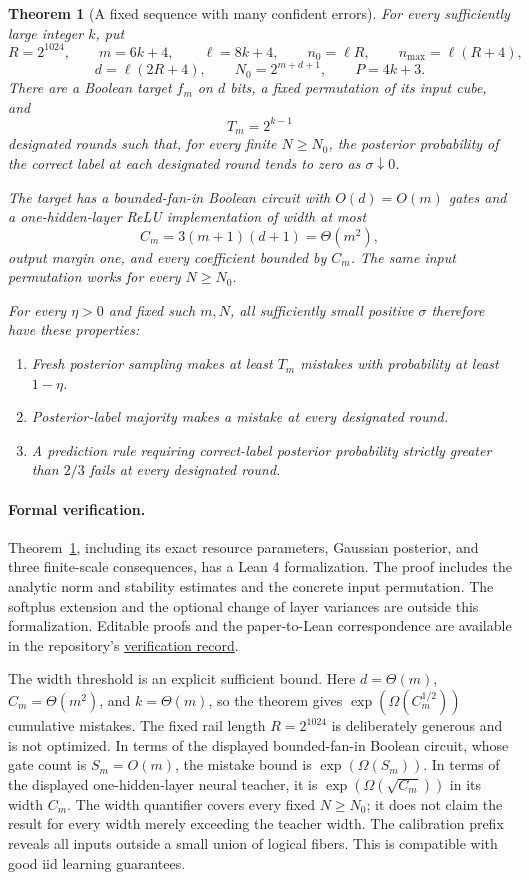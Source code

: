 \documentclass[11pt]{article}
\newtheorem{theorem}{Theorem}
\theoremstyle{remark}\newtheorem{remark}[theorem]{Remark}
\begin{document}
\begin{theorem}[A fixed sequence with many confident errors]\label{thm:main}
For every sufficiently large integer $k$, put
\[
 R=2^{1024},\qquad m=6k+4,\qquad \ell=8k+4,\qquad n_0=\ell R,
 \qquad n_{\max}=\ell(R+4),
\]
\[
 d=\ell(2R+4),\qquad N_0=2^{m+d+1},\qquad P=4k+3.
\]
There are a Boolean target $f_m$ on $d$ bits, a fixed permutation of its
input cube, and
\[
 T_m=2^{k-1}
\]
designated rounds such that, for every finite $N\ge N_0$, the posterior
probability of the correct label at each designated round tends to zero
as $\sigma\downarrow0$.

The target has a bounded-fan-in Boolean circuit with $O(d)=O(m)$ gates
and a one-hidden-layer ReLU implementation of width at most
\[
 C_m=3(m+1)(d+1)=\Theta(m^2),
\]
output margin one, and every coefficient bounded by $C_m$. The same input
permutation works for every $N\ge N_0$.

For every $\eta>0$ and fixed such $m,N$, all sufficiently small positive
$\sigma$ therefore have these properties:
\begin{enumerate}
\item Fresh posterior sampling makes at least $T_m$ mistakes with
probability at least $1-\eta$.
\item Posterior-label majority makes a mistake at every designated round.
\item A prediction rule requiring correct-label posterior probability
strictly greater than $2/3$ fails at every designated round.
\end{enumerate}
\end{theorem}

\paragraph{Formal verification.}
Theorem~\ref{thm:main}, including its exact resource parameters,
Gaussian posterior, and three finite-scale consequences, has a Lean 4
formalization. The proof includes the analytic norm and stability
estimates and the concrete input permutation. The softplus extension and
the optional change of layer variances are outside this formalization.
Editable proofs and the paper-to-Lean correspondence are available in
the repository's \href{https://github.com/kaarelh/AI-works/blob/main/neural-network-generalization/works-in-progress/online-mistakes/isotropic-relu-allwidth/verification/README.md}{verification record}.

The width threshold is an explicit sufficient bound. Here
$d=\Theta(m)$, $C_m=\Theta(m^2)$, and $k=\Theta(m)$, so the
theorem gives $\exp(\Omega(C_m^{1/2}))$ cumulative mistakes.
The fixed rail length $R=2^{1024}$ is deliberately generous and is not
optimized. In terms of the displayed bounded-fan-in Boolean circuit,
whose gate count is $S_m=O(m)$, the mistake bound is
$\exp(\Omega(S_m))$. In terms of the displayed one-hidden-layer neural
teacher, it is $\exp(\Omega(\sqrt{C_m}))$ in its width $C_m$.
The width quantifier covers every fixed $N\ge N_0$; it does not claim
the result for every width merely exceeding the teacher width.
The calibration prefix reveals all inputs outside a small union of
logical fibers. This is compatible with good iid learning guarantees.
\end{document}
